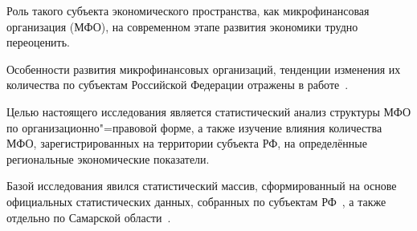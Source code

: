 














\date{26/VIII/2013}




\maketitle



Роль такого субъекта экономического пространства, как микрофинансовая организация (МФО), на современном этапе развития экономики трудно переоценить. 

Особенности развития микрофинансовых организаций, тенденции изменения их количества по субъектам Российской Федерации отражены в работе~\cite{repina:bib1}.



Целью настоящего исследования является статистический анализ структуры МФО по организационно"=правовой форме, а также изучение влияния количества МФО, зарегистрированных на территории субъекта РФ, на определённые региональные экономические показатели.



Базой исследования явился статистический массив, сформированный на основе официальных статистических данных, собранных по субъектам РФ~\cite{repina:bib2}, а также отдельно по Самарской области~\cite{repina:bib3}. 




